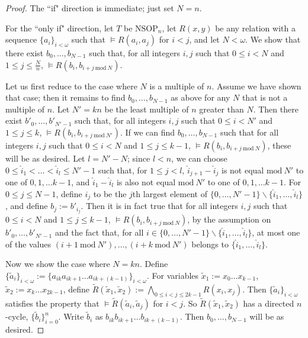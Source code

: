 \documentclass{amsart}
\theoremstyle{definition}
\theoremstyle{remark}
\numberwithin{equation}{section}
\begin{document}
\begin{proof}
    The ``if" direction is immediate; just set $N = n$.
    
    
    For the ``only if" direction, let $T$ be $\mathrm{NSOP}_{n}$, let $R(x, y)$ be any relation with a sequence $\{a_{i}\}_{i < \omega}$ such that $\models R(a_{i}, a_{j})$ for $i <j$, and let $N < \omega$. We show that there exist $b_{0}, \ldots, b_{N -1} $ such that, for all integers $i, j$ such that $0 \leq i <N$ and $1 \leq j \leq \frac{N}{n}$,  $\models R(b_{i}, b_{i+j \mathrm{\: mod \:} N})$.

    Let us first reduce to the case where $N$ is a multiple of $n$. Assume we have shown that case; then it remains to find $b_{0}, \ldots, b_{N -1} $ as above for any $N$ that is not a multiple of $n$. Let $N'=kn$ be the least multiple of $n$ greater than $N$. Then there exist $b'_{0}, \ldots, b'_{N' -1} $ such that, for all integers $i, j$ such that $0 \leq i <N'$ and $1 \leq j \leq k $,  $\models R(b_{i}, b_{i+j \mathrm{\: mod \:} N'})$. If we can find $b_{0}, \ldots, b_{N -1} $ such that for all integers $i, j$ such that $0 \leq i <N$ and $1 \leq j \leq k-1 $,  $\models R(b_{i}, b_{i+j \mathrm{\: mod \:} N})$, these will be as desired. Let $l = N' - N$; since $l < n$, we can choose $0 \leq \hat{i}_{1} < \ldots < \hat{i}_{l}\leq N'-1$ such that, for $1 \leq j < l$, $\hat{i}_{j+1} - \hat{i}_{j} $ is not equal $\mathrm{mod} \: N'$ to one of $0, 1, \ldots k-1$, and $\hat{i}_{1} - \hat{i}_{l} $ is also not equal $\mathrm{mod} \: N'$ to one of $0, 1, \ldots k-1$. For $0 \leq j \leq N-1$, define $i_{j}$ to be the $j$th largest element of $\{0, \ldots, N'-1\} \backslash \{\hat{i}_{1} , \ldots , \hat{i}_{l}\}$, and define $b_{j} := b'_{i_{j}}$. Then it is in fact true that for all integers $i, j$ such that $0 \leq i <N$ and $1 \leq j \leq k-1 $,  $\models R(b_{i}, b_{i+j \mathrm{\: mod \:} N})$, by the assumption on $b'_{0}, \ldots, b'_{N' -1} $ and the fact that, for all $i \in \{0, \ldots, N'-1\} \backslash \{\hat{i}_{1} , \ldots , \hat{i}_{l}\}$, at most one of the values $(i+1 \: \mathrm{mod} \: N'), \ldots, (i + k \: \mathrm{mod} \: N') $ belongs to $\{\hat{i}_{1} , \ldots , \hat{i}_{l}\}$.

    Now we show the case where $N = kn$. Define $\{\tilde{a}_{i}\}_{i < \omega} := \{a_{ik}a_{ik+1} \ldots a_{ik+(k-1)} \}_{i < \omega} $. For variables $\tilde{x}_{1} := x_{0}\ldots x_{k-1} $, $\tilde{x}_{2} := x_{k} \ldots x_{2k-1}$, define $\tilde{R}(\tilde{x}_{1}, \tilde{x}_{2}) := \bigwedge_{0 \leq i < j \leq 2k -1} R(x_{i}, x_{j})$. Then $\{\tilde{a}_{i}\}_{i < \omega}$ satisfies the property that $\models \tilde{R}(\tilde{a}_{i}, \tilde{a}_{j})$ for $i < j$. So $\tilde{R}(\tilde{x}_{1}, \tilde{x}_{2})$ has a directed $n$-cycle, $\{\tilde{b}_{i}\}^{n}_{i = 0}$. Write $\tilde{b}_{i}$ as $b_{ik}b_{ik+1} \ldots b_{ik+(k-1)}$. Then $b_{0}, \ldots, b_{N -1} $ will be as desired.
\end{proof}
\end{document}

